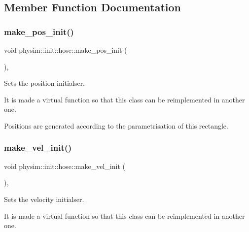 \subsection{Member Function Documentation}
\mbox{\label{classphysim_1_1init_1_1hose_aa016b0a21281702a41368c8bd0fb5745}} 
\subsubsection{\texorpdfstring{make\+\_\+pos\+\_\+init()}{make\_pos\_init()}}
{\footnotesize\ttfamily void physim\+::init\+::hose\+::make\+\_\+pos\+\_\+init (\begin{DoxyParamCaption}{ }\end{DoxyParamCaption})\hspace{0.3cm}{\ttfamily [protected]}, {\ttfamily [virtual]}}



Sets the position initialser. 

It is made a virtual function so that this class can be reimplemented in another one.

Positions are generated according to the parametrisation of this rectangle. \mbox{\label{classphysim_1_1init_1_1hose_a7b5f4309df8149bfb3d81e538e71ef24}} 
\subsubsection{\texorpdfstring{make\+\_\+vel\+\_\+init()}{make\_vel\_init()}}
{\footnotesize\ttfamily void physim\+::init\+::hose\+::make\+\_\+vel\+\_\+init (\begin{DoxyParamCaption}{ }\end{DoxyParamCaption})\hspace{0.3cm}{\ttfamily [protected]}, {\ttfamily [virtual]}}



Sets the velocity initialser. 

It is made a virtual function so that this class can be reimplemented in another one. \mbox{\label{classphysim_1_1init_1_1hose_a6f7f673fe4d7a21e850ad09ee27c2651}} 
